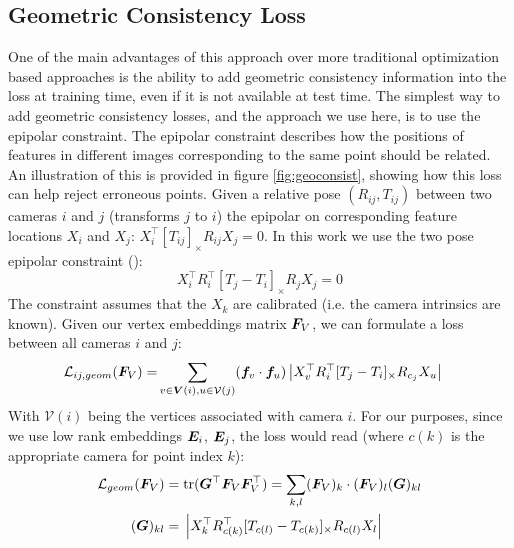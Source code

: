 \documentclass{article} %
\newcommand{\cross}[1]{[#1]_{\times}}
\begin{document}
\subsection{Geometric Consistency Loss}

One of the main advantages of this approach over more traditional optimization based approaches is the ability to add geometric consistency information into the loss at training time, even if it is not available at test time.
The simplest way to add geometric consistency losses, and the approach we use here, is to use the epipolar constraint.
The epipolar constraint describes how the positions of features in different images corresponding to the same point should be related.
An illustration of this is provided in figure \ref{fig:geoconsist}, showing how this loss can help reject erroneous points.
Given a relative pose $(R_{ij}, T_{ij})$ between two cameras $i$ and $j$  (transforms $j$ to $i$) the epipolar on corresponding feature locations $X_i$ and $X_j$: $X_{i}^\top \cross{T_{ij}}R_{ij} X_{j} = 0$.
In this work we use the two pose epipolar constraint (\cite{tron2014quotient}):
\begin{equation}
X_{i}^\top R_{i}^\top \cross{T_{j} - T_{i}}R_{j} X_{j} = 0
\label{eq:essential_constraint}
\end{equation}
The constraint assumes that the $X_k$ are calibrated (i.e. the camera intrinsics are known). 
Given our vertex embeddings matrix ${\bm{F}}_V$, we can formulate a loss between all cameras $i$ and $j$:
\begin{align}
\mathcal{L}_{ij,geom}(\mF_V) = 
&\sum_{v \in \mV(i),u \in \mathcal{V}(j)} (\vf_v \cdot \vf_u) \left|X_{v}^\top R_{i}^\top \cross{T_{j} - T_{i}}R_{c_j} X_{u}\right|
\label{eq:geom_cost}
\end{align}
With $\mathcal{V}(i)$ being the vertices associated with camera $i$.
For our purposes, since we use low rank embeddings ${\bm{E}}_{i}$, ${\bm{E}}_{j}$, the loss would read (where $c(k)$ is the appropriate camera for point index $k$):
\begin{align} 
\mathcal{L}_{geom}(\mF_V)
=&\; \mathrm{tr}(\mG^\top \mF_V\mF_V^\top) = \sum_{k,l} (\mF_V)_{k} \cdot (\mF_V)_{l} (\mG)_{kl} \label{eq:geom_cost2} \\
(\mG)_{kl} =&\; \left|X_{k}^\top R_{c(k)}^\top \cross{T_{c(l)} - T_{c(k)}}R_{c(l)} X_{l}\right| \nonumber
\end{align}
\end{document}
